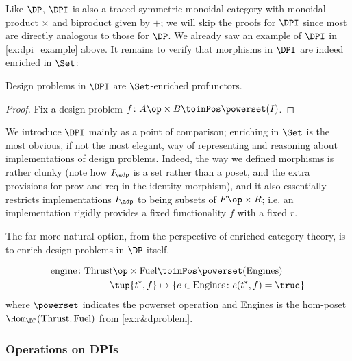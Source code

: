 \begin{lemma}[unitality]
\end{lemma}


Like $\DP$, $\DPI$ is also a traced symmetric monoidal category with monoidal product $\times$ and biproduct given by $+$; we will skip the proofs for $\DPI$ since most are directly analogous to those for $\DP$. We already saw an example of $\DPI$ in \cref{ex:dpi_example} above. It remains to verify that morphisms in $\DPI$ are indeed enriched in $\Set$:

\begin{proposition}
Design problems in $\DPI$ are $\Set$-enriched profunctors.
\end{proposition}
\begin{proof}
Fix a design problem $f \colon A\op \times B \toinPos \powerset(I)$. 

\end{proof}

We introduce $\DPI$ mainly as a point of comparison; enriching in $\Set$ is the most obvious, if not the most elegant, way of representing and reasoning about implementations of design problems. Indeed, the way we defined morphisms is rather clunky (note how $I_\adp$ is a set rather than a poset, and the extra provisions for prov and req in the identity morphism), and it also essentially restricts implementations $I_\adp$ to being subsets of $F\op \times R$; i.e. an implementation rigidly provides a fixed functionality $f$ with a fixed $r$.

The far more natural option, from the perspective of enriched category theory, is to enrich design problems in $\DP$ itself.

\begin{example}
\begin{equation}
\begin{aligned}
\text{engine} \colon \text{Thrust}\op \times \text{Fuel} &\toinPos \powerset(\text{Engines}) \\
\tup{t^*,f} &\mapsto \{ e \in \text{Engines} \colon e(t^*, f) = \true \}
\end{aligned}
\end{equation}
where $\powerset$ indicates the powerset operation and Engines is the hom-poset $\Hom_\DP(\text{Thrust}, \text{Fuel})$ from \cref{ex:r&dproblem}.
\end{example}


\subsubsection{Operations on DPIs}


